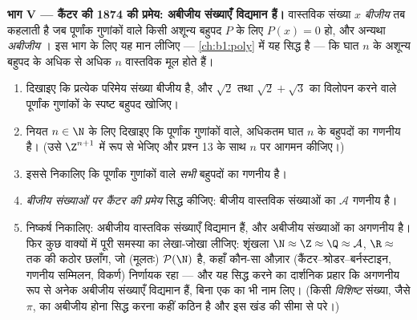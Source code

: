 \begin{problem}
\medskip \noindent\textbf{भाग V --- कैंटर की 1874 की प्रमेय: अबीजीय संख्याएँ
विद्यमान हैं।} वास्तविक संख्या $x$ \emph{बीजीय}  तब
कहलाती है जब पूर्णांक गुणांकों वाले किसी अशून्य बहुपद $P$ के लिए $P(x) = 0$
हो, और अन्यथा \emph{अबीजीय} । इस भाग के लिए यह मान
लीजिए --- \cref{ch:b1:poly} में यह सिद्ध है --- कि घात $n$ के अशून्य बहुपद
के अधिक से अधिक $n$ वास्तविक मूल होते हैं।
\begin{enumerate}[resume]
  \item दिखाइए कि प्रत्येक परिमेय संख्या बीजीय है, और $\sqrt 2$ तथा $\sqrt 2
  + \sqrt 3$ का विलोपन करने वाले पूर्णांक गुणांकों के स्पष्ट बहुपद खोजिए।
  \item नियत $n \in \N$ के लिए दिखाइए कि पूर्णांक गुणांकों वाले, अधिकतम घात
  $n$ के बहुपदों का  गणनीय है। (उसे $\Z^{n+1}$ में  रूप से भेजिए
  और प्रश्न 13 के साथ $n$ पर आगमन कीजिए।)
  \item इससे निकालिए कि पूर्णांक गुणांकों वाले \emph{सभी} बहुपदों का 
  गणनीय है।
  \item \emph{बीजीय संख्याओं पर कैंटर की प्रमेय} सिद्ध कीजिए: बीजीय वास्तविक
  संख्याओं का  $\mathcal{A}$ गणनीय है।
  \item निष्कर्ष निकालिए: अबीजीय वास्तविक संख्याएँ विद्यमान हैं, और अबीजीय
  संख्याओं का  अगणनीय है। फिर कुछ वाक्यों में पूरी समस्या का
  लेखा-जोखा लीजिए: शृंखला $\N \approx \Z \approx \Q \approx \mathcal{A}$,
  $\R \approx$ तक की कठोर छलाँग, जो (मूलतः) $\mathcal{P}(\N)$ है, कहाँ
  कौन-सा औज़ार (कैंटर--श्रोडर--बर्नस्टाइन, गणनीय सम्मिलन, विकर्ण) निर्णायक
  रहा --- और यह सिद्ध करने का दार्शनिक प्रहार कि अगणनीय रूप से अनेक अबीजीय
  संख्याएँ विद्यमान हैं, बिना एक का भी नाम लिए। (किसी \emph{विशिष्ट} संख्या,
  जैसे $\pi$, का अबीजीय होना सिद्ध करना कहीं कठिन है और इस खंड की सीमा से
  परे।)
\end{enumerate}
\end{problem}

